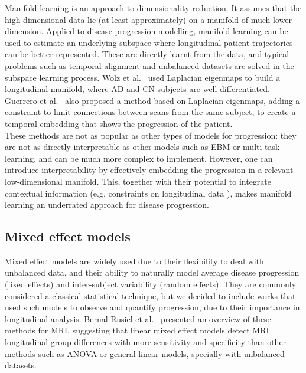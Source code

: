 Manifold learning is an approach to dimensionality reduction. It assumes that the high-dimensional data lie (at least approximately) on a manifold of much lower dimension. Applied to disease progression modelling, manifold learning can be used to estimate an underlying subspace where longitudinal patient trajectories can be better represented. These are directly learnt from the data, and typical problems such as temporal alignment and unbalanced datasets are solved in the subspace learning process. Wolz et al.\ \cite{Wolz2010} used Laplacian eigenmaps to build a longitudinal manifold, where AD and CN subjects are well differentiated. Guerrero et al.\ \cite{Guerrero2015,guerrero} also proposed a method based on Laplacian eigenmaps, adding a constraint to limit connections between scans from the same subject, to create a temporal embedding that shows the progression of the patient. \\

These methods are not as popular as other types of models for progression: they are not as directly interpretable as other models such as EBM or multi-task learning, and can be much more complex to implement. However, one can introduce interpretability by effectively embedding the progression in a relevant low-dimensional manifold. This, together with their potential to integrate contextual information (e.g. constraints on longitudinal data \cite{Guerrero2015}), makes manifold learning an underrated approach for disease progression.

\subsection{Mixed effect models}

Mixed effect models are widely used due to their flexibility to deal with unbalanced data, and their ability to naturally model average disease progression (fixed effects) and inter-subject variability (random effects). They are commonly considered a classical statistical technique, but we decided to include works that used such models to observe and quantify progression, due to their importance in longitudinal analysis. Bernal-Rusiel et al.\ \cite{Bernal-Rusiel2013} presented an overview of these methods for MRI, suggesting that linear mixed effect models detect MRI longitudinal group differences with more sensitivity and specificity than other methods such as ANOVA or general linear models, specially with unbalanced datasets. \\

